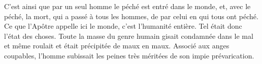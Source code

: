 C’est ainsi que par un seul homme le péché est entré dans le monde,
	et, avec le péché, la mort, qui a passé à tous les hommes,
	de par celui en qui tous ont péché.
Ce que l’Apôtre appelle ici le monde, c’est l’humanité entière.
Tel était donc l’état des choses.
	Toute la masse du genre humain gisait condamnée dans le mal
	et même roulait et était précipitée de maux en maux.
Associé aux anges coupables,
	l’homme subissait les peines très méritées de son impie prévarication.
